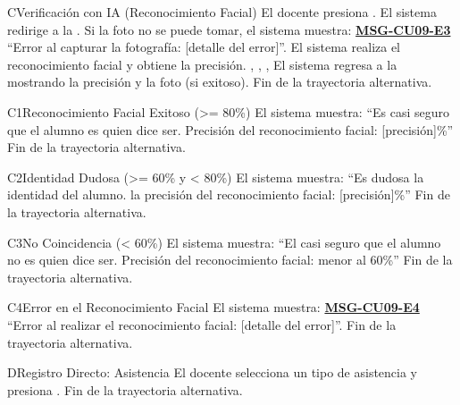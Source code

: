 \begin{UCtrayectoriaA}{C}{Verificación con IA (Reconocimiento Facial)}
	\UCpaso[\UCactor] El docente presiona .
	\UCpaso El sistema redirige a la .
	\UCpaso Si la foto no se puede tomar, el sistema muestra: \textbf{\hyperref[msg:CU09-E3]{MSG-CU09-E3}} ``Error al capturar la fotografía: [detalle del error]''.
	\UCpaso El sistema realiza el reconocimiento facial y obtiene la precisión. , , , 
	\UCpaso El sistema regresa a la  mostrando la precisión y la foto (si exitoso).
	\UCpaso Fin de la trayectoria alternativa.
\end{UCtrayectoriaA}
\begin{UCtrayectoriaA}{C1}{Reconocimiento Facial Exitoso (>= 80\%)}
	\UCpaso El sistema muestra: ``Es casi seguro que el alumno es quien dice ser. Precisión del reconocimiento facial: [precisión]\%''
	\UCpaso Fin de la trayectoria alternativa.
\end{UCtrayectoriaA}
\begin{UCtrayectoriaA}{C2}{Identidad Dudosa (>= 60\% y < 80\%)}
	\UCpaso El sistema muestra: ``Es dudosa la identidad del alumno. la precisión del reconocimiento facial: [precisión]\%''
	\UCpaso Fin de la trayectoria alternativa.
\end{UCtrayectoriaA}
\begin{UCtrayectoriaA}{C3}{No Coincidencia (< 60\%)}
	\UCpaso El sistema muestra: ``El casi seguro que el alumno no es quien dice ser. Precisión del reconocimiento facial: menor al 60\%''
	\UCpaso Fin de la trayectoria alternativa.
\end{UCtrayectoriaA}
\begin{UCtrayectoriaA}{C4}{Error en el Reconocimiento Facial}
	\UCpaso El sistema muestra: \textbf{\hyperref[msg:CU09-E4]{MSG-CU09-E4}} ``Error al realizar el reconocimiento facial: [detalle del error]''.
	\UCpaso Fin de la trayectoria alternativa.
\end{UCtrayectoriaA}

\begin{UCtrayectoriaA}{D}{Registro Directo: Asistencia}
	\UCpaso[\UCactor] El docente selecciona un tipo de asistencia y presiona . 
	\UCpaso Fin de la trayectoria alternativa.
\end{UCtrayectoriaA}

